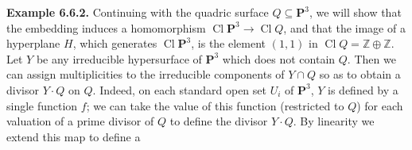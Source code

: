 {\medskip
\noindent\hypertarget{result-II-6.6.2}{}\textbf{Example 6.6.2.} Continuing with the quadric surface $Q\subseteq\mathbf P^3$, we will show that the embedding induces a homomorphism $\operatorname{Cl}\mathbf P^3\to\operatorname{Cl} Q$, and that the image of a hyperplane $H$, which generates $\operatorname{Cl}\mathbf P^3$, is the element $(1,1)$ in $\operatorname{Cl} Q=\mathbb Z\oplus\mathbb Z$. Let $Y$ be any irreducible hypersurface of $\mathbf P^3$ which does not contain $Q$. Then we can assign multiplicities to the irreducible components of $Y\cap Q$ so as to obtain a divisor $Y\cdot Q$ on $Q$. Indeed, on each standard open set $U_i$ of $\mathbf P^3$, $Y$ is defined by a single function $f$; we can take the value of this function (restricted to $Q$) for each valuation of a prime divisor of $Q$ to define the divisor $Y\cdot Q$. By linearity we extend this map to define a}
